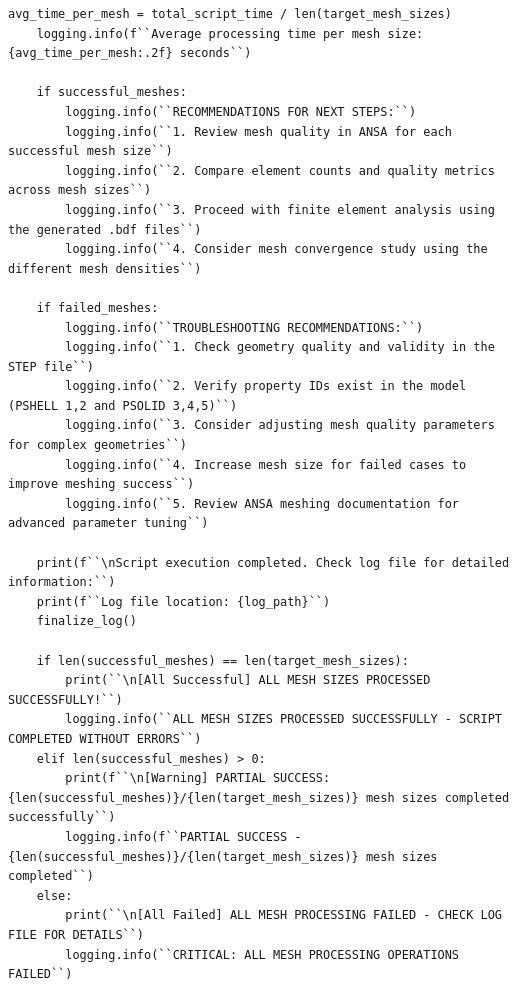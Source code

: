 \documentclass{book}
\begin{document}
\begin{itemize}[leftmargin=*,label=\textbullet]
\begin{lstlisting}[caption={Main Execution Block - Summary and Recommendations},label={lst:main_4}]
    avg_time_per_mesh = total_script_time / len(target_mesh_sizes)
    logging.info(f``Average processing time per mesh size: {avg_time_per_mesh:.2f} seconds``)

    if successful_meshes:
        logging.info(``RECOMMENDATIONS FOR NEXT STEPS:``)
        logging.info(``1. Review mesh quality in ANSA for each successful mesh size``)
        logging.info(``2. Compare element counts and quality metrics across mesh sizes``)
        logging.info(``3. Proceed with finite element analysis using the generated .bdf files``)
        logging.info(``4. Consider mesh convergence study using the different mesh densities``)

    if failed_meshes:
        logging.info(``TROUBLESHOOTING RECOMMENDATIONS:``)
        logging.info(``1. Check geometry quality and validity in the STEP file``)
        logging.info(``2. Verify property IDs exist in the model (PSHELL 1,2 and PSOLID 3,4,5)``)
        logging.info(``3. Consider adjusting mesh quality parameters for complex geometries``)
        logging.info(``4. Increase mesh size for failed cases to improve meshing success``)
        logging.info(``5. Review ANSA meshing documentation for advanced parameter tuning``)

    print(f``\nScript execution completed. Check log file for detailed information:``)
    print(f``Log file location: {log_path}``)
    finalize_log()

    if len(successful_meshes) == len(target_mesh_sizes):
        print(``\n[All Successful] ALL MESH SIZES PROCESSED SUCCESSFULLY!``)
        logging.info(``ALL MESH SIZES PROCESSED SUCCESSFULLY - SCRIPT COMPLETED WITHOUT ERRORS``)
    elif len(successful_meshes) > 0:
        print(f``\n[Warning] PARTIAL SUCCESS: {len(successful_meshes)}/{len(target_mesh_sizes)} mesh sizes completed successfully``)
        logging.info(f``PARTIAL SUCCESS - {len(successful_meshes)}/{len(target_mesh_sizes)} mesh sizes completed``)
    else:
        print(``\n[All Failed] ALL MESH PROCESSING FAILED - CHECK LOG FILE FOR DETAILS``)
        logging.info(``CRITICAL: ALL MESH PROCESSING OPERATIONS FAILED``)


\end{lstlisting}
\end{itemize}
\end{document}
